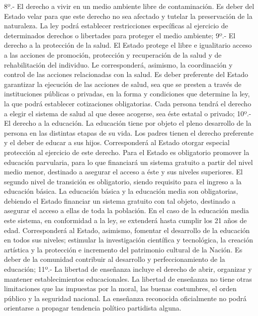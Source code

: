     8º.- El derecho a vivir en un medio ambiente libre de contaminación. Es deber del Estado velar para que este derecho no sea afectado y tutelar la preservación de la naturaleza.
    La ley podrá establecer restricciones específicas al ejercicio de determinados derechos o libertades para proteger el medio ambiente;
    9º.- El derecho a la protección de la salud.
    El Estado protege el libre e igualitario acceso a las acciones de promoción, protección y recuperación de la salud y de rehabilitación del individuo.
    Le corresponderá, asimismo, la coordinación y control de las acciones relacionadas con la salud.
    Es deber preferente del Estado garantizar la ejecución de las acciones de salud, sea que se presten a través de instituciones públicas o privadas, en la forma y condiciones que determine la ley, la que podrá establecer cotizaciones obligatorias.
    Cada persona tendrá el derecho a elegir el sistema de salud al que desee acogerse, sea éste estatal o privado;
    10º.- El derecho a la educación.
    La educación tiene por objeto el pleno desarrollo de la persona en las distintas etapas de su vida.
    Los padres tienen el derecho preferente y el deber de educar a sus hijos. Corresponderá al Estado otorgar especial protección al ejercicio de este derecho.
    Para el Estado es obligatorio promover la educación parvularia, para lo que financiará un sistema gratuito a partir del nivel medio menor, destinado a asegurar el acceso a éste y sus niveles superiores. El segundo nivel de transición es obligatorio, siendo requisito para el ingreso a la educación básica.
    La educación básica y la educación media son obligatorias, debiendo el Estado financiar un sistema gratuito con tal objeto, destinado a asegurar el acceso a ellas de toda la población. En el caso de la educación media este sistema, en conformidad a la ley, se extenderá hasta cumplir los 21 años de edad.
    Corresponderá al Estado, asimismo, fomentar el desarrollo de la educación en todos sus niveles; estimular la investigación científica y tecnológica, la creación artística y la protección e incremento del patrimonio cultural de la Nación.
    Es deber de la comunidad contribuir al desarrollo y perfeccionamiento de la educación;
    11º.- La libertad de enseñanza incluye el derecho de abrir, organizar y mantener establecimientos educacionales.
    La libertad de enseñanza no tiene otras limitaciones que las impuestas por la moral, las buenas costumbres, el orden público y la seguridad nacional.
    La enseñanza reconocida oficialmente no podrá orientarse a propagar tendencia político partidista alguna.
